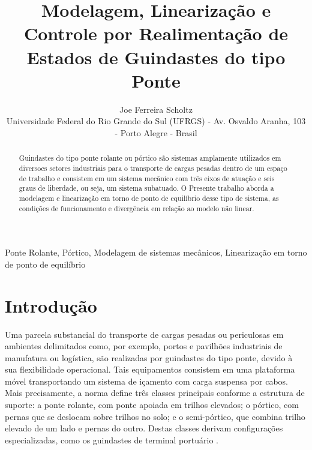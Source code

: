 \documentclass{ppgeesa}
\begin{document}
\title{Modelagem, Linearização e Controle por Realimentação de Estados de Guindastes do tipo Ponte}

\author{
  Joe Ferreira Scholtz\\
	{Universidade Federal do Rio Grande do Sul (UFRGS) - Av. Osvaldo Aranha, 103 - Porto Alegre - Brasil} \\
}

\maketitle
\thispagestyle{empty}\pagestyle{empty}

\begin{abstract} %
Guindastes do tipo ponte rolante ou pórtico são sistemas amplamente utilizados em diversoes setores industriais para o transporte de cargas pesadas dentro de um espaço de trabalho e consistem em um sistema mecânico com três eixos de atuação e seis graus de liberdade, ou seja, um sistema subatuado. O Presente trabalho aborda a modelagem e linearização em torno de ponto de equilíbrio desse tipo de sistema, as condições de funcionamento e divergência em relação ao modelo não linear.
\end{abstract} %

\begin{IEEEkeywords}
Ponte Rolante, Pórtico, Modelagem de sistemas mecânicos, Linearização em torno de ponto de equilíbrio
\end{IEEEkeywords}

\section{Introdução}

Uma parcela substancial do transporte de cargas pesadas ou periculosas em ambientes delimitados como, por exemplo, portos e pavilhões industriais de manufatura ou logística, são realizadas por guindastes do tipo ponte, devido à sua flexibilidade operacional. Tais equipamentos consistem em uma plataforma móvel transportando um sistema de içamento com carga suspensa por cabos. Mais precisamente, a norma \cite{ISO4306_1_2007} define três classes principais conforme a estrutura de suporte: a ponte rolante, com ponte apoiada em trilhos elevados; o pórtico, com pernas que se deslocam sobre trilhos no solo; e o semi-pórtico, que combina trilho elevado de um lado e pernas do outro. Destas classes derivam configurações especializadas, como os guindastes de terminal portuário \cite{thiago2026}.
\end{document}
